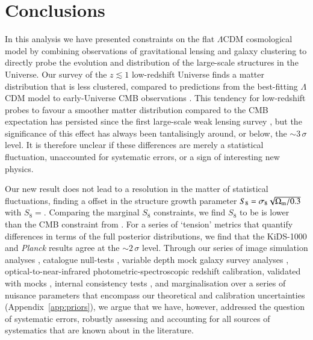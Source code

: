 \section{Conclusions}
\label{sec:conc}
In this analysis we have presented constraints on the flat $\Lambda$CDM cosmological model by combining observations of gravitational lensing and galaxy clustering to directly probe the evolution and distribution of the large-scale structures in the Universe.    Our survey of the $z \lesssim 1$ low-redshift Universe finds a matter distribution that is less clustered, compared to predictions from the best-fitting $\Lambda$CDM model to early-Universe CMB observations \citep{planck/etal:2018}.  This tendency for low-redshift probes to favour a smoother matter distribution compared to the CMB expectation has persisted since the first large-scale weak lensing survey \citep[CFHTLenS,][]{heymans/etal:2013}, but the significance of this effect has always been tantalisingly around, or below, the $\sim\! 3\,\sigma$ level.   It is therefore unclear if these differences are merely a statistical fluctuation, unaccounted for systematic errors, or a sign of interesting new physics.

Our new result does not lead to a resolution in the matter of statistical fluctuations, finding a \kpoff offset in the structure growth parameter $S_8 = \sigma_8 \sqrt{\Omega_{\rm m}/0.3}$ with $S_8=$\kSeightval.  Comparing the marginal $S_8$ constraints, we find $S_8$ to be is \kpoffperc lower than the CMB constraint from \citet{planck/etal:2018}.   For a series of `tension' metrics that quantify differences in terms of the full posterior distributions, we find that the KiDS-1000 and {\it Planck} results agree at the $\sim\! 2\,\sigma$ level.   Through our series of image simulation analyses \citep{kannawadi/etal:2019}, catalogue null-tests \citep{giblin/etal:inprep}, variable depth mock galaxy survey analyses \citep{joachimi/etal:inprep}, optical-to-near-infrared photometric-spectroscopic redshift calibration, validated with mocks \citep{wright/etal:2020, vandenbusch/etal:2020,hildebrandt/etal:inprep}, internal consistency tests \citep[][Fig.~\ref{fig:cosmology-params-all} and Appendix~\ref{app:sensitivity}]{asgari/etal:inprep}, and marginalisation over a series of nuisance parameters that encompass our theoretical and calibration uncertainties (Appendix~\ref{app:priors}),  we argue that we have, however, addressed the question of \tttp systematic errors, robustly assessing and accounting for all sources of systematics that are known about in the literature.    

